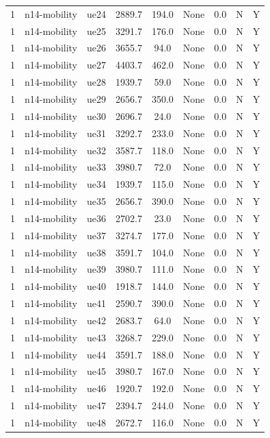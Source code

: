 \begin{table}[ht]
\begin{tabular}{|c|c|c|c|c|c|c|c|c|}
1 & n14-mobility & ue24 & 2889.7 & 194.0 & None & 0.0 & N & Y \\
1 & n14-mobility & ue25 & 3291.7 & 176.0 & None & 0.0 & N & Y \\
1 & n14-mobility & ue26 & 3655.7 & 94.0 & None & 0.0 & N & Y \\
1 & n14-mobility & ue27 & 4403.7 & 462.0 & None & 0.0 & N & Y \\
1 & n14-mobility & ue28 & 1939.7 & 59.0 & None & 0.0 & N & Y \\
1 & n14-mobility & ue29 & 2656.7 & 350.0 & None & 0.0 & N & Y \\
1 & n14-mobility & ue30 & 2696.7 & 24.0 & None & 0.0 & N & Y \\
1 & n14-mobility & ue31 & 3292.7 & 233.0 & None & 0.0 & N & Y \\
1 & n14-mobility & ue32 & 3587.7 & 118.0 & None & 0.0 & N & Y \\
1 & n14-mobility & ue33 & 3980.7 & 72.0 & None & 0.0 & N & Y \\
1 & n14-mobility & ue34 & 1939.7 & 115.0 & None & 0.0 & N & Y \\
1 & n14-mobility & ue35 & 2656.7 & 390.0 & None & 0.0 & N & Y \\
1 & n14-mobility & ue36 & 2702.7 & 23.0 & None & 0.0 & N & Y \\
1 & n14-mobility & ue37 & 3274.7 & 177.0 & None & 0.0 & N & Y \\
1 & n14-mobility & ue38 & 3591.7 & 104.0 & None & 0.0 & N & Y \\
1 & n14-mobility & ue39 & 3980.7 & 111.0 & None & 0.0 & N & Y \\
1 & n14-mobility & ue40 & 1918.7 & 144.0 & None & 0.0 & N & Y \\
1 & n14-mobility & ue41 & 2590.7 & 390.0 & None & 0.0 & N & Y \\
1 & n14-mobility & ue42 & 2683.7 & 64.0 & None & 0.0 & N & Y \\
1 & n14-mobility & ue43 & 3268.7 & 229.0 & None & 0.0 & N & Y \\
1 & n14-mobility & ue44 & 3591.7 & 188.0 & None & 0.0 & N & Y \\
1 & n14-mobility & ue45 & 3980.7 & 167.0 & None & 0.0 & N & Y \\
1 & n14-mobility & ue46 & 1920.7 & 192.0 & None & 0.0 & N & Y \\
1 & n14-mobility & ue47 & 2394.7 & 244.0 & None & 0.0 & N & Y \\
1 & n14-mobility & ue48 & 2672.7 & 116.0 & None & 0.0 & N & Y \\

\end{tabular}
\end{table}
